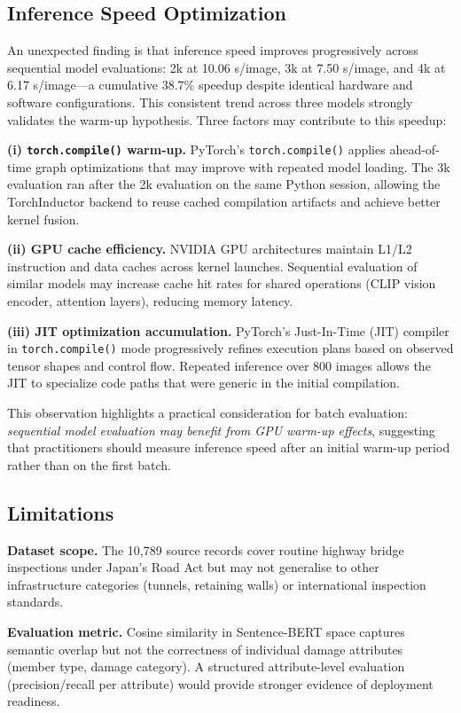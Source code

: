 \documentclass[twocolumn]{article}
\begin{document}
\subsection{Inference Speed Optimization}

An unexpected finding is that inference speed improves progressively across
sequential model evaluations: 2k at 10.06 s/image, 3k at 7.50 s/image, and
4k at 6.17 s/image---a cumulative 38.7\% speedup despite identical hardware
and software configurations.
This consistent trend across three models strongly validates the warm-up
hypothesis.
Three factors may contribute to this speedup:

\textbf{(i) \texttt{torch.compile()} warm-up.}
PyTorch's \texttt{torch.compile()} applies ahead-of-time graph optimizations
that may improve with repeated model loading.
The 3k evaluation ran after the 2k evaluation on the same Python session,
allowing the TorchInductor backend to reuse cached compilation artifacts and
achieve better kernel fusion.

\textbf{(ii) GPU cache efficiency.}
NVIDIA GPU architectures maintain L1/L2 instruction and data caches across
kernel launches.
Sequential evaluation of similar models may increase cache hit rates for
shared operations (CLIP vision encoder, attention layers), reducing memory
latency.

\textbf{(iii) JIT optimization accumulation.}
PyTorch's Just-In-Time (JIT) compiler in \texttt{torch.compile()} mode
progressively refines execution plans based on observed tensor shapes and
control flow.
Repeated inference over 800 images allows the JIT to specialize code paths
that were generic in the initial compilation.

This observation highlights a practical consideration for batch evaluation:
\textit{sequential model evaluation may benefit from GPU warm-up effects},
suggesting that practitioners should measure inference speed after an initial
warm-up period rather than on the first batch.

\subsection{Limitations}

\textbf{Dataset scope.}
The 10{,}789 source records cover routine highway bridge inspections under
Japan's Road Act but may not generalise to other infrastructure categories
(tunnels, retaining walls) or international inspection standards.

\textbf{Evaluation metric.}
Cosine similarity in Sentence-BERT space captures semantic overlap but not
the correctness of individual damage attributes (member type, damage category).
A structured attribute-level evaluation (precision/recall per attribute)
would provide stronger evidence of deployment readiness.
\end{document}
